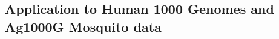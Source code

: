 \documentclass[9pt,twocolumn,twoside]{pnas-new} %
\providecommand{\DIFdelbegin}{} %
\providecommand{\DIFdelend}{} %
\begin{document}
\DIFdelbegin %

\DIFdelend \subsection*{Application to Human 1000 Genomes and Ag1000G Mosquito data}
\end{document}
